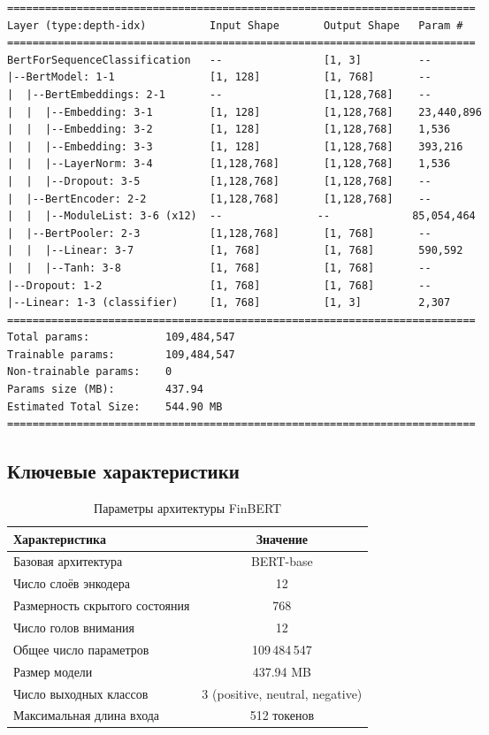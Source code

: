 \documentclass[a4paper,12pt]{article}
\begin{document}
\begin{lstlisting}[language={}, caption={Архитектура FinBERT (torchinfo)}, basicstyle=\ttfamily\scriptsize]
==========================================================================
Layer (type:depth-idx)          Input Shape       Output Shape   Param #
==========================================================================
BertForSequenceClassification   --                [1, 3]         --
|--BertModel: 1-1               [1, 128]          [1, 768]       --
|  |--BertEmbeddings: 2-1       --                [1,128,768]    --
|  |  |--Embedding: 3-1         [1, 128]          [1,128,768]    23,440,896
|  |  |--Embedding: 3-2         [1, 128]          [1,128,768]    1,536
|  |  |--Embedding: 3-3         [1, 128]          [1,128,768]    393,216
|  |  |--LayerNorm: 3-4         [1,128,768]       [1,128,768]    1,536
|  |  |--Dropout: 3-5           [1,128,768]       [1,128,768]    --
|  |--BertEncoder: 2-2          [1,128,768]       [1,128,768]    --
|  |  |--ModuleList: 3-6 (x12)  --               --             85,054,464
|  |--BertPooler: 2-3           [1,128,768]       [1, 768]       --
|  |  |--Linear: 3-7            [1, 768]          [1, 768]       590,592
|  |  |--Tanh: 3-8              [1, 768]          [1, 768]       --
|--Dropout: 1-2                 [1, 768]          [1, 768]       --
|--Linear: 1-3 (classifier)     [1, 768]          [1, 3]         2,307
==========================================================================
Total params:            109,484,547
Trainable params:        109,484,547
Non-trainable params:    0
Params size (MB):        437.94
Estimated Total Size:    544.90 MB
==========================================================================
\end{lstlisting}

\subsection{Ключевые характеристики}

\begin{table}[H]
\centering
\caption{Параметры архитектуры FinBERT}
\label{tab:finbert_arch}
\begin{tabular}{|l|c|}
\hline
\textbf{Характеристика} & \textbf{Значение} \\
\hline
Базовая архитектура & BERT-base \\
\hline
Число слоёв энкодера & 12 \\
\hline
Размерность скрытого состояния & 768 \\
\hline
Число голов внимания & 12 \\
\hline
Общее число параметров & 109\,484\,547 \\
\hline
Размер модели & 437.94 MB \\
\hline
Число выходных классов & 3 (positive, neutral, negative) \\
\hline
Максимальная длина входа & 512 токенов \\
\hline
\end{tabular}
\end{table}
\end{document}
